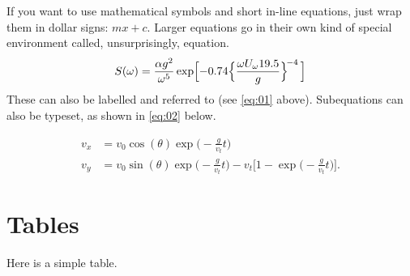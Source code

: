 \documentclass[draft, {\secondLanguage}, english]{volcanica-template}
\begin{document}
If you want to use mathematical symbols and short in-line equations, just wrap them in dollar signs: $mx +c$. Larger equations go in their own kind of special environment called, unsurprisingly, equation.
\begin{equation}
S(\omega) = \frac{\alpha g^2}{\omega^5} \exp\Bigl[ -0.74\Bigl\{\frac{\omega U_\omega 19.5}{g}\Bigr\}^{\!-4}\,\Bigr] 
\label{eq:01}\end{equation}
These can also be labelled and referred to (see \autoref{eq:01} above). Subequations can also be typeset, as shown in \autoref{eq:02} below.

\begin{subequations}
\begin{align}
v_x &= v_0 \cos(\theta)\exp\bigg(-\frac{g}{v_t}t\bigg) \label{eq:2a}\\[0.5ex]
v_y &=v_0\sin(\theta)\exp\bigg(-\frac{g}{v_t}t\bigg)-v_t\bigg[1-\exp\bigg(-\frac{g}{v_t}t\bigg)\bigg]. \label{eq:2b}\end{align}
\label{eq:02}
\end{subequations}

\section{Tables}

Here is a simple table.
\end{document}
